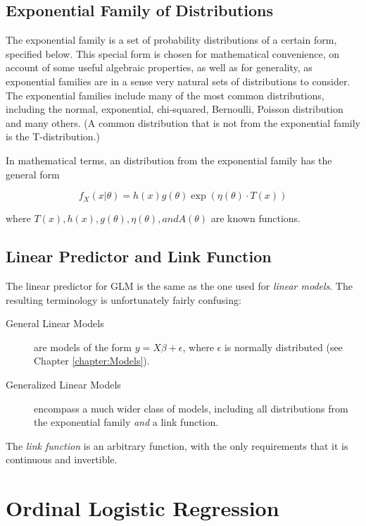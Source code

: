 \subsection{Exponential Family of Distributions}

The exponential family is a set of probability distributions of a certain form, specified below. This special form is chosen for mathematical convenience, on account of some useful algebraic properties, as well as for generality, as exponential families are in a sense very natural sets of distributions to consider. The exponential families include many of the most common distributions, including the normal, exponential, chi-squared, Bernoulli, Poisson distribution and many others. (A common distribution that is not from the exponential family is the T-distribution.)

In mathematical terms, an distribution from the exponential family has the general form

\begin{equation}\label{eq:exponentialFamily}
  f_X(x|\theta) = h(x) g(\theta) \exp \left ( \eta(\theta) \cdot T(x) \right )
\end{equation}

where $T(x), h(x), g(\theta), \eta(\theta), and A(\theta)$ are known functions.

\subsection{Linear Predictor and Link Function}

The linear predictor for GLM is the same as the one used for \emph{linear models}. The resulting terminology is unfortunately fairly confusing:

\begin{description}
  \item[General Linear Models] are models of the form $y=X\beta+ \epsilon$, where $\epsilon$ is normally distributed (see Chapter \ref{chapter:Models}).
  \item[Generalized Linear Models] encompass a much wider class of models, including all distributions from the exponential family \emph{and} a link function.
\end{description}

The \emph{link function} is an arbitrary function, with the only requirements that it is continuous and invertible.

\section{Ordinal Logistic Regression}

